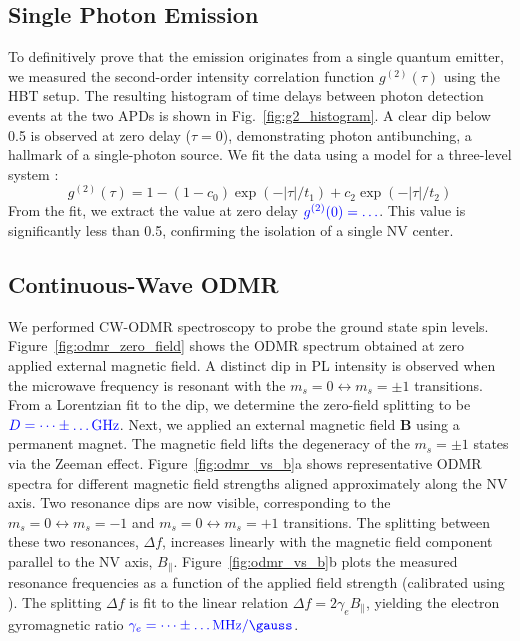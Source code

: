 \documentclass[aps,prb,twocolumn,superscriptaddress,floatfix,longbibliography,citeautoscript]{revtex4-2}
\begin{document}
\subsection{\label{sec:results_g2}Single Photon Emission}
To definitively prove that the emission originates from a single quantum emitter, we measured the second-order intensity correlation function $g^{(2)}(\tau)$ using the HBT setup.
The resulting histogram of time delays between photon detection events at the two APDs is shown in Fig.~\ref{fig:g2_histogram}.
A clear dip below 0.5 is observed at zero delay ($\tau=0$), demonstrating photon antibunching, a hallmark of a single-photon source.
We fit the data using a model for a three-level system \cite{Kurtsiefer2000PRL, Beveratos2001PRA}: %
\begin{equation}
    g^{(2)}(\tau) = 1 - (1 - c_0) \exp(-|\tau|/t_1) + c_2 \exp(-|\tau|/t_2)
    \label{eq:g2_fit}
\end{equation}
From the fit, we extract the value at zero delay $\textcolor{blue}{g^{(2)}(0) = \dots}$.
This value is significantly less than 0.5, confirming the isolation of a single NV center.

\subsection{\label{sec:results_cwodmr}Continuous-Wave ODMR}
We performed CW-ODMR spectroscopy to probe the ground state spin levels.
Figure~\ref{fig:odmr_zero_field} shows the ODMR spectrum obtained at zero applied external magnetic field.
A distinct dip in PL intensity is observed when the microwave frequency is resonant with the $m_s=0 \leftrightarrow m_s=\pm 1$ transitions.
From a Lorentzian fit to the dip, we determine the zero-field splitting to be $\textcolor{blue}{D = \dots \pm \dots \si{\giga\hertz}}$.
Next, we applied an external magnetic field $\mathbf{B}$ using a permanent magnet.
The magnetic field lifts the degeneracy of the $m_s = \pm 1$ states via the Zeeman effect.
Figure~\ref{fig:odmr_vs_b}a shows representative ODMR spectra for different magnetic field strengths aligned approximately along the NV axis.
Two resonance dips are now visible, corresponding to the $m_s=0 \leftrightarrow m_s=-1$ and $m_s=0 \leftrightarrow m_s=+1$ transitions.
The splitting between these two resonances, $\Delta f$, increases linearly with the magnetic field component parallel to the NV axis, $B_\parallel$.
Figure~\ref{fig:odmr_vs_b}b plots the measured resonance frequencies as a function of the applied field strength (calibrated using ).
The splitting $\Delta f$ is fit to the linear relation $\Delta f = 2 \gamma_e B_\parallel$, yielding the electron gyromagnetic ratio $\blue{\gamma_e = \dots \pm \dots \si{\MHz\per\gauss}}$.
\end{document}
